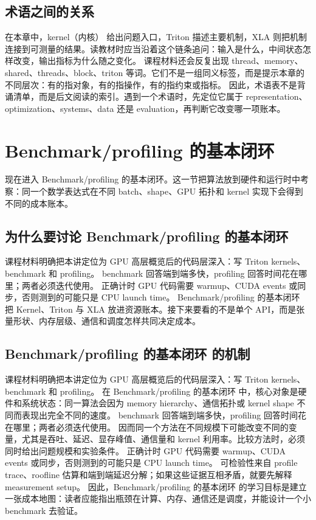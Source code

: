 \documentclass[a4paper]{article}
\begin{document}
\subsection{术语之间的关系}
在本章中，kernel（内核） 给出问题入口，Triton 描述主要机制，XLA 则把机制连接到可测量的结果。读教材时应当沿着这个链条追问：输入是什么，中间状态怎样改变，输出指标为什么随之变化。
课程材料还会反复出现 thread、memory、shared、threads、block、triton 等词。它们不是一组同义标签，而是提示本章的不同层次：有的指对象，有的指操作，有的指约束或指标。
因此，术语表不是背诵清单，而是后文阅读的索引。遇到一个术语时，先定位它属于 representation、optimization、systems、data 还是 evaluation，再判断它改变哪一项账本。
\section{Benchmark/profiling 的基本闭环}
现在进入 Benchmark/profiling 的基本闭环。这一节把算法放到硬件和运行时中考察：同一个数学表达式在不同 batch、shape、GPU 拓扑和 kernel 实现下会得到不同的成本账本。
\subsection{为什么要讨论 Benchmark/profiling 的基本闭环}
课程材料明确把本讲定位为 GPU 高层概览后的代码层深入：写 Triton kernels、benchmark 和 profiling。
benchmark 回答端到端多快，profiling 回答时间花在哪里；两者必须迭代使用。
正确计时 GPU 代码需要 warmup、CUDA events 或同步，否则测到的可能只是 CPU launch time。
Benchmark/profiling 的基本闭环 把 Kernel、Triton 与 XLA 放进资源账本。接下来要看的不是单个 API，而是张量形状、内存层级、通信和调度怎样共同决定成本。
\subsection{Benchmark/profiling 的基本闭环 的机制}
课程材料明确把本讲定位为 GPU 高层概览后的代码层深入：写 Triton kernels、benchmark 和 profiling。 在 Benchmark/profiling 的基本闭环 中，核心对象是硬件和系统状态：同一算法会因为 memory hierarchy、通信拓扑或 kernel shape 不同而表现出完全不同的速度。
benchmark 回答端到端多快，profiling 回答时间花在哪里；两者必须迭代使用。 因而同一个方法在不同规模下可能改变不同的变量，尤其是吞吐、延迟、显存峰值、通信量和 kernel 利用率。比较方法时，必须同时给出问题规模和实验条件。
正确计时 GPU 代码需要 warmup、CUDA events 或同步，否则测到的可能只是 CPU launch time。 可检验性来自 profile trace、roofline 估算和端到端延迟分解；如果这些证据互相矛盾，就要先解释 measurement setup。
因此，Benchmark/profiling 的基本闭环 的学习目标是建立一张成本地图：读者应能指出瓶颈在计算、内存、通信还是调度，并能设计一个小 benchmark 去验证。
\end{document}
